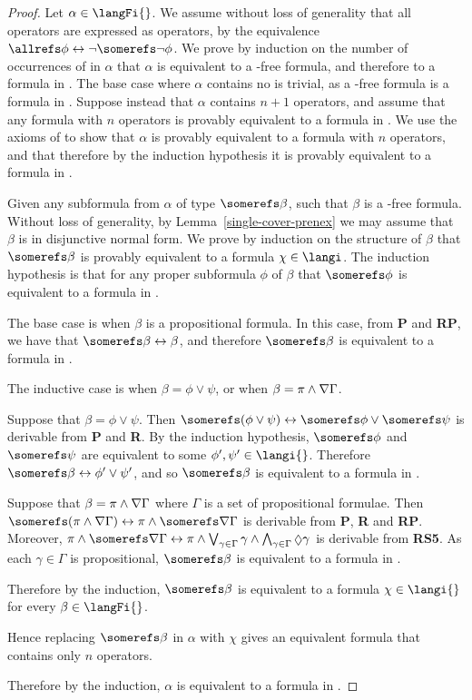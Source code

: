 \begin{proof}
Let $\alpha \in \langFi{}$. We assume without loss of generality that all
\allrefs{} operators are expressed as \somerefs{} operators, by the equivalence
$\allrefs \phi \iff \neg \somerefs \neg \phi$. We prove by induction on the
number of occurrences of \somerefs{} in $\alpha$ that $\alpha$ is equivalent to
a \somerefs{}-free formula, and therefore to a formula in \langi{}. The base case
where $\alpha$ contains no \somerefs{} is trivial, as a \somerefs{}-free formula
is a formula in \langi{}. Suppose instead that $\alpha$ contains $n + 1$
\somerefs{} operators, and assume that any formula with $n$ \somerefs{}
operators is provably equivalent to a formula in \langi{}. We use the axioms of
\axiomSiF{} to show that $\alpha$ is provably equivalent to a formula with $n$
\somerefs{} operators, and that therefore by the induction hypothesis it is
provably equivalent to a formula in \langi{}.

Given any subformula from $\alpha$ of type $\somerefs \beta$, such that $\beta$
is a \somerefs{}-free formula. Without loss of generality, by
Lemma~\ref{single-cover-prenex} we may assume that $\beta$ is in disjunctive
normal form. We prove by induction on the structure of $\beta$ that $\somerefs
\beta$ is provably equivalent to a formula $\chi \in \langi$. The induction
hypothesis is that for any proper subformula $\phi$ of $\beta$ that $\somerefs
\phi$ is equivalent to a formula in \langi{}.

The base case is when $\beta$ is a propositional formula. In this case, from
{\bf P} and {\bf RP}, we have that $\somerefs \beta \iff \beta$, and therefore
$\somerefs \beta$ is equivalent to a formula in \langi{}.

The inductive case is when $\beta = \phi \lor \psi$, or when $\beta = \pi \land
\nabla \Gamma$. 

Suppose that $\beta = \phi \lor \psi$. Then $\somerefs (\phi \lor \psi) \iff
\somerefs \phi \lor \somerefs \psi$ is derivable from {\bf P} and {\bf R}. By
the induction hypothesis, $\somerefs \phi$ and $\somerefs \psi$ are equivalent
to some $\phi', \psi' \in \langi{}$. Therefore $\somerefs \beta \iff \phi' \lor
\psi'$, and so $\somerefs \beta$ is equivalent to a formula in \langi{}.

Suppose that $\beta = \pi \land \nabla \Gamma$ where $\Gamma$ is a set of
propositional formulae. Then $\somerefs (\pi \land \covers \Gamma) \iff
\pi \land \somerefs \covers \Gamma$ is derivable from {\bf P}, {\bf R} and {\bf
RP}. Moreover, $\pi \land \somerefs \covers \Gamma \iff \pi \land
\bigvee_{\gamma \in \Gamma} \gamma \land \bigwedge_{\gamma \in \Gamma} \suspects
\gamma$ is derivable from {\bf RS5}. As each $\gamma \in \Gamma$ is
propositional, $\somerefs \beta$ is equivalent to a formula in \langi{}.

Therefore by the induction, $\somerefs \beta$ is
equivalent to a formula $\chi \in \langi{}$ for every $\beta \in \langFi{}$.

Hence replacing $\somerefs \beta$ in $\alpha$ with $\chi$ gives an equivalent
formula that contains only $n$ \somerefs{} operators.

Therefore by the induction, $\alpha$ is equivalent to a formula in \langi{}.
\end{proof}
